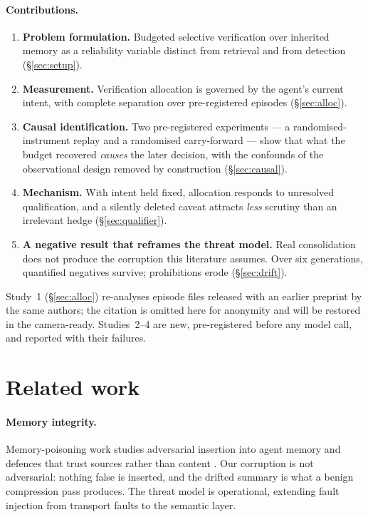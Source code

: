 \documentclass{article}
\begin{document}
\paragraph{Contributions.}
\begin{enumerate}\itemsep2pt
\item \textbf{Problem formulation.} Budgeted selective verification over
inherited memory as a reliability variable distinct from retrieval and from
detection (\S\ref{sec:setup}).
\item \textbf{Measurement.} Verification allocation is governed by the agent's
current intent, with complete separation over \ExpOneN{} pre-registered episodes
(\S\ref{sec:alloc}).
\item \textbf{Causal identification.} Two pre-registered experiments --- a
randomised-instrument replay and a randomised carry-forward --- show that what
the budget recovered \emph{causes} the later decision, with the confounds of the
observational design removed by construction (\S\ref{sec:causal}).
\item \textbf{Mechanism.} With intent held fixed, allocation responds to
unresolved qualification, and a silently deleted caveat attracts \emph{less}
scrutiny than an irrelevant hedge (\S\ref{sec:qualifier}).
\item \textbf{A negative result that reframes the threat model.} Real
consolidation does not produce the corruption this literature assumes. Over six
generations, quantified negatives survive; prohibitions erode
(\S\ref{sec:drift}).
\end{enumerate}

Study~1 (\S\ref{sec:alloc}) re-analyses episode files released with an earlier
preprint by the same authors; the citation is omitted here for anonymity and
will be restored in the camera-ready. Studies~2--4 are new, pre-registered
before any model call, and reported with their failures.

\section{Related work}

\paragraph{Memory integrity.} Memory-poisoning work studies adversarial
insertion into agent memory \citep{dash2026untrusted,xie2026memevobench} and
defences that trust sources rather than content \citep{singh2026belief}.
Our corruption is not adversarial: nothing false is inserted, and the drifted
summary is what a benign compression pass produces. The threat model is
operational, extending fault injection \citep{tan2026agentchaos} from transport
faults to the semantic layer.
\end{document}
